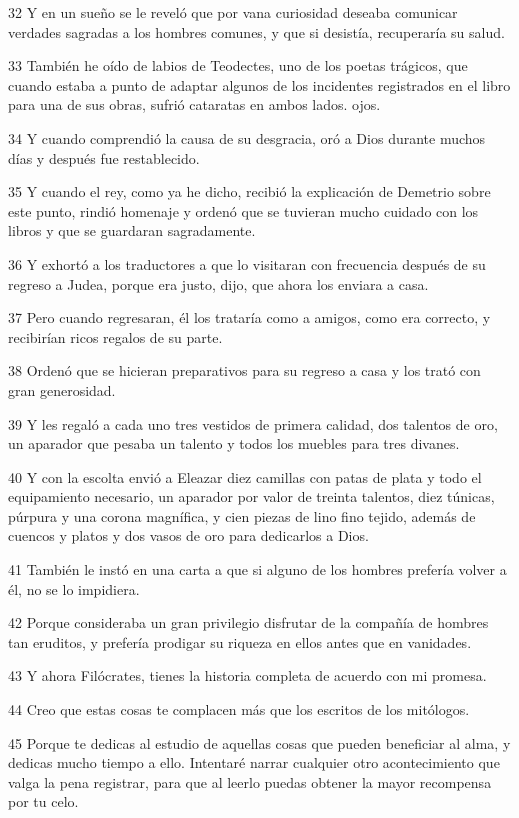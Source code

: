 \par 32 Y en un sueño se le reveló que por vana curiosidad deseaba comunicar verdades sagradas a los hombres comunes, y que si desistía, recuperaría su salud.

\par 33 También he oído de labios de Teodectes, uno de los poetas trágicos, que cuando estaba a punto de adaptar algunos de los incidentes registrados en el libro para una de sus obras, sufrió cataratas en ambos lados. ojos.

\par 34 Y cuando comprendió la causa de su desgracia, oró a Dios durante muchos días y después fue restablecido.

\par 35 Y cuando el rey, como ya he dicho, recibió la explicación de Demetrio sobre este punto, rindió homenaje y ordenó que se tuvieran mucho cuidado con los libros y que se guardaran sagradamente.

\par 36 Y exhortó a los traductores a que lo visitaran con frecuencia después de su regreso a Judea, porque era justo, dijo, que ahora los enviara a casa.

\par 37 Pero cuando regresaran, él los trataría como a amigos, como era correcto, y recibirían ricos regalos de su parte.

\par 38 Ordenó que se hicieran preparativos para su regreso a casa y los trató con gran generosidad.

\par 39 Y les regaló a cada uno tres vestidos de primera calidad, dos talentos de oro, un aparador que pesaba un talento y todos los muebles para tres divanes.

\par 40 Y con la escolta envió a Eleazar diez camillas con patas de plata y todo el equipamiento necesario, un aparador por valor de treinta talentos, diez túnicas, púrpura y una corona magnífica, y cien piezas de lino fino tejido, además de cuencos y platos y dos vasos de oro para dedicarlos a Dios.

\par 41 También le instó en una carta a que si alguno de los hombres prefería volver a él, no se lo impidiera.

\par 42 Porque consideraba un gran privilegio disfrutar de la compañía de hombres tan eruditos, y prefería prodigar su riqueza en ellos antes que en vanidades.

\par 43 Y ahora Filócrates, tienes la historia completa de acuerdo con mi promesa.

\par 44 Creo que estas cosas te complacen más que los escritos de los mitólogos.

\par 45 Porque te dedicas al estudio de aquellas cosas que pueden beneficiar al alma, y ​​dedicas mucho tiempo a ello. Intentaré narrar cualquier otro acontecimiento que valga la pena registrar, para que al leerlo puedas obtener la mayor recompensa por tu celo.


